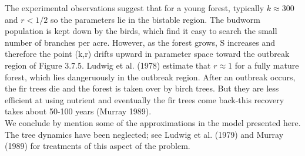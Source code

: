 \documentclass{article}
\newcommand\tab[1][1cm]{\hspace*{#1}}
\begin{document}
The experimental observations suggest that for a young forest, typically $k \approx 300$ and $r<1/2$ so the parameters lie in the bistable region. The budworm population is kept down by the birds, which find it easy to search the small number of branches per acre. However, as the forest grows, S increases and therefore the point (k,r) drifts upward in parameter space toward the outbreak region of Figure 3.7.5. Ludwig et al. (1978) estimate that $r \approx 1$ for a fully mature forest, which lies dangeruously in the outbreak region. After an outbreak occurs, the fir trees die and the forest is taken over by birch trees. But they are less efficient at using nutrient and eventually the fir trees come back-this recovery takes about 50-100 years (Murray 1989). \\ \tab 
We conclude by mention some of the approximations in the model presented here. The tree dynamics have been neglected; see Ludwig et al. (1979) and Murray (1989) for treatments of this aspect of the problem.
\end{document}
